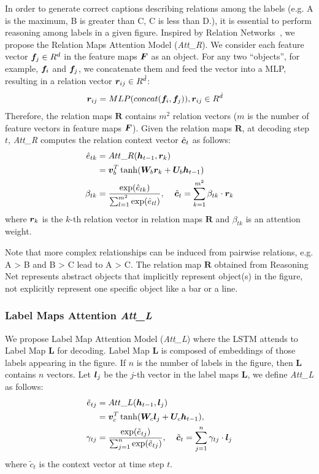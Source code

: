 \documentclass[11pt,a4paper]{article}
\begin{document}
In order to generate correct captions describing relations among the labels (e.g. A is the maximum, B is greater than C, C is less than D.), it is essential to perform reasoning among labels in a given figure. Inspired by Relation Networks~\cite{santoro2017simple}, we propose the Relation Maps Attention Model (\textit{Att\_R}). We consider each feature vector ${\boldsymbol f}_j\in R^{d}$ in the feature maps ${\boldsymbol F}$ as an object. For any two ``objects'', for example, ${\boldsymbol f}_i$ and ${\boldsymbol f}_j$, we concatenate them and feed the vector into a MLP, resulting in a relation vector ${\boldsymbol r}_{ij} \in R^{\hat{d}}$:
\begin{align}
{\boldsymbol r}_{ij} & = MLP(concat({\boldsymbol f}_i, {\boldsymbol f}_j)), {\boldsymbol r}_{ij} \in R^{\Hat{d}}
\end{align}
Therefore, the relation maps $\bm{R}$ contains $m^2$ relation vectors ($m$ is the number of feature vectors in feature maps ${\boldsymbol F}$).   
Given the relation maps $\bm{R}$, at decoding step $t$, \textit{Att\_R} computes the relation context vector $\hat{{\boldsymbol c}}_t$ as follows:
\begin{align}
\hat{e}_{tk} & = Att\_R({\boldsymbol h}_{t-1}, {\boldsymbol r}_k) \label{eq:attention2}  \\
 & = {\boldsymbol v}^T_b \tanh({\boldsymbol W}_b {\boldsymbol r}_{k} + {\boldsymbol U}_b {\boldsymbol h}_{t-1}) \nonumber  \\
\beta_{tk} & = \frac{\exp(\hat{e}_{tk})}{\sum_{l=1}^{m^2}\exp(\hat{e}_{tl})} \nonumber,
\:\:\:\:\:\hat{{\boldsymbol c}}_t = \sum_{k=1}^{m^2}\beta_{tk} \cdot {\boldsymbol r}_k \nonumber 
\end{align}
where ${\boldsymbol r}_k$ is the $k$-th relation vector in relation maps $\bm{R}$ and $\beta_{tk}$ is an attention weight.


Note that more complex relationships can be induced from pairwise relations, e.g. A > B and B > C lead to A > C. The relation map $\bm{R}$ obtained from Reasoning Net represents abstract objects that implicitly represent object(s) in the figure, not explicitly represent one specific object like a bar or a line.


\subsubsection{Label Maps Attention \textit{Att\_L}}

We propose Label Map Attention Model (\textit{Att\_L}) where the LSTM attends to Label Map $\bm{L}$ for decoding. Label Map $\bm{L}$ is composed of embeddings of those labels appearing in the figure. If $n$ is the number of labels in the figure, then $\bm{L}$ contains $n$ vectors. 
Let ${\boldsymbol l}_j$ be the $j$-th vector in the label maps $\bm{L}$, we define \textit{Att\_L} as follows:
\begin{align}
\tilde{e}_{tj} & = Att\_L({\boldsymbol h}_{t-1}, {\boldsymbol l}_j) \label{eq:attention3}  \\
 & = {\boldsymbol v}^T_c \tanh({\boldsymbol W}_c {\boldsymbol l}_{j} + {\boldsymbol U}_c {\boldsymbol h}_{t-1}) \nonumber,\\
\gamma_{tj} & = \frac{\exp(\tilde{e}_{tj})}{\sum_{j=1}^{n}\exp(\tilde{e}_{tj})} \nonumber,
\:\:\:\:\:\tilde{{\boldsymbol c}}_t = \sum_{j=1}^{n}\gamma_{tj} \cdot {\boldsymbol l}_j \nonumber 
\end{align}
where $\tilde{c}_t$ is the context vector at time step $t$.
\end{document}
